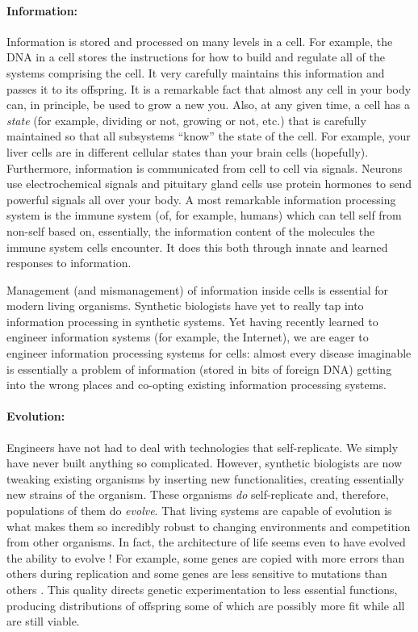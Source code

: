 \paragraph{Information:} Information is stored and processed on many
levels in a cell. For example, the DNA in a cell stores the
instructions for how to build and regulate all of the systems
comprising the cell. It very carefully maintains this information and
passes it to its offspring. It is a remarkable fact that almost any
cell in your body can, in principle, be used to grow a new you. Also,
at any given time, a cell has a {\em state} (for example, dividing or
not, growing or not, etc.) that is carefully maintained so that all
subsystems ``know'' the state of the cell. For example, your liver
cells are in different cellular states than your brain cells
(hopefully). Furthermore, information is communicated from cell to
cell via signals. Neurons use electrochemical signals and pituitary
gland cells use protein hormones to send powerful signals all over
your body. A most remarkable information processing system is the
immune system (of, for example, humans) which can tell self from
non-self based on, essentially, the information content of the
molecules the immune system cells encounter. It does this both through
innate and learned responses to information.

Management (and mismanagement) of information inside cells is
essential for modern living organisms. Synthetic biologists have yet
to really tap into information processing in synthetic systems. Yet
having recently learned to engineer information systems (for example,
the Internet), we are eager to engineer information processing systems
for cells: almost every disease imaginable is essentially a problem of
information (stored in bits of foreign DNA) getting into the wrong
places and co-opting existing information processing systems.
%
%

\paragraph{Evolution:} Engineers have not had to deal with technologies
that self-replicate. We simply have never built anything so
complicated. However, synthetic biologists are now tweaking existing
organisms by inserting new functionalities, creating essentially new
strains of the organism. These organisms {\em do} self-replicate and,
therefore, populations of them do {\em evolve}. That living systems
are capable of evolution is what makes them so incredibly robust to
changing environments and competition from other organisms. In fact,
the architecture of life seems even to have evolved the ability to
evolve \cite{evolvability}! For example, some genes are copied with
more errors than others during replication and some genes are less
sensitive to mutations than others \cite{gene-amplification}. This
quality directs genetic experimentation to less essential functions,
producing distributions of offspring some of which are possibly more
fit while all are still viable.


